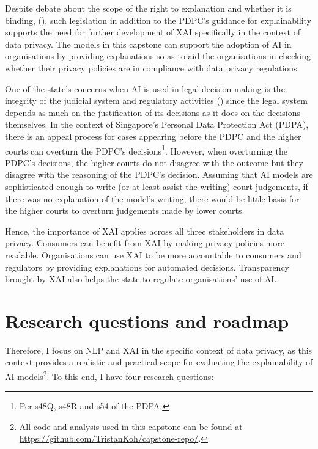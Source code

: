 Despite debate about the scope of the right to explanation and whether it is binding, (\cite{chesterman2021_transparency}), such legislation in addition to the PDPC's guidance for explainability supports the need for further development of XAI specifically in the context of data privacy. The models in this capstone can support the adoption of AI in organisations by providing explanations so as to aid the organisations in checking whether their privacy policies are in compliance with data privacy regulations.

One of the state's concerns when AI is used in legal decision making is the integrity of the judicial system and regulatory activities (\cite{chesterman2021_opacity}) since the legal system depends as much on the justification of its decisions as it does on the decisions themselves. In the context of Singapore's Personal Data Protection Act (PDPA), there is an appeal process for cases appearing before the PDPC and the higher courts can overturn the PDPC's decisions\footnote{Per s48Q, s48R and s54 of the PDPA.}. However, when overturning the PDPC's decisions, the higher courts do not disagree with the outcome but they disagree with the reasoning of the PDPC's decision. Assuming that AI models are sophisticated enough to write (or at least assist the writing) court judgements, if there was no explanation of the model's writing, there would be little basis for the higher courts to overturn judgements made by lower courts. 

Hence, the importance of XAI applies across all three stakeholders in data privacy. Consumers can benefit from XAI by making privacy policies more readable. Organisations can use XAI to be more accountable to consumers and regulators by providing explanations for automated decisions. Transparency brought by XAI also helps the state to regulate organisations' use of AI.

\section{Research questions and roadmap}
Therefore, I focus on NLP and XAI in the specific context of data privacy, as this context provides a realistic and practical scope for evaluating the explainability of AI models\footnote{All code and analysis used in this capstone can be found at \url{https://github.com/TristanKoh/capstone-repo/}.}. To this end, I have four research questions: 

